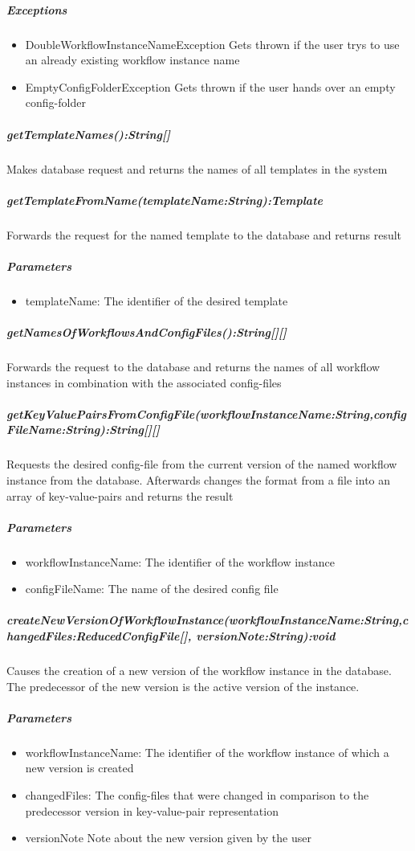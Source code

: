 \subparagraph{Exceptions}
\begin{itemize}
	\item{DoubleWorkflowInstanceNameException}
	Gets thrown if the user trys to use an already existing workflow instance name
	\item{EmptyConfigFolderException}
	Gets thrown if the user hands over an empty config-folder
\end{itemize}

\subparagraph{getTemplateNames():String[]}
Makes database request and returns the names of all templates in the system

\subparagraph{getTemplateFromName(templateName:String):Template}
Forwards the request for the named template to the database and returns result

\subparagraph{Parameters}
\begin{itemize}
	\item{templateName:}
	The identifier of the desired template
\end{itemize}

\subparagraph{getNamesOfWorkflowsAndConfigFiles():String[][]}
Forwards the request to the database and returns the names of all workflow instances in combination with the associated config-files

\subparagraph{getKeyValuePairsFromConfigFile(workflowInstanceName:String,configFileName:String):String[][]}
Requests the desired config-file from the current version of the named workflow instance from the database. Afterwards changes the format from a file into an array of key-value-pairs and returns the result

\subparagraph{Parameters}
\begin{itemize}
	\item{workflowInstanceName:}
	The identifier of the workflow instance
	\item{configFileName:}
	The name of the desired config file
\end{itemize}

\subparagraph{createNewVersionOfWorkflowInstance(workflowInstanceName:String,changedFiles:ReducedConfigFile[], versionNote:String):void}
Causes the creation of a new version of the workflow instance in the database. The predecessor of the new version is the active version of the instance.

\subparagraph{Parameters}
\begin{itemize}
	\item{workflowInstanceName:}
	The identifier of the workflow instance of which a new version is created
	\item{changedFiles:}
	The config-files that were changed in comparison to the predecessor version in key-value-pair representation
	\item{versionNote}
	Note about the new version given by the user
\end{itemize}

